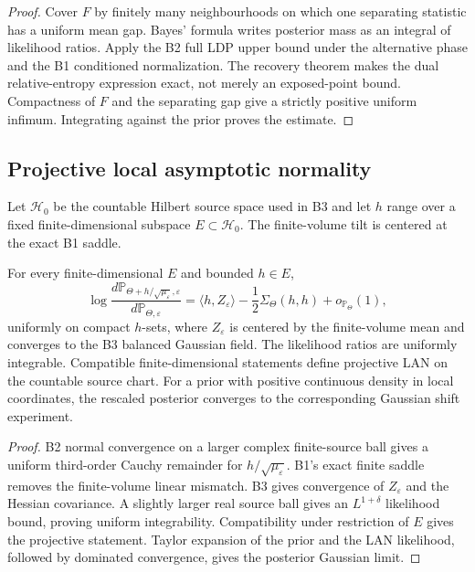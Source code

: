 \begin{proof}
Cover \(F\) by finitely many neighbourhoods on which one separating statistic
has a uniform mean gap.  Bayes' formula writes posterior mass as an integral
of likelihood ratios.  Apply the B2 full LDP upper bound under the alternative
phase and the B1 conditioned normalization.  The recovery theorem makes the
dual relative-entropy expression exact, not merely an exposed-point bound.
Compactness of \(F\) and the separating gap give a strictly positive uniform
infimum.  Integrating against the prior proves the estimate.
\end{proof}

\subsection{Projective local asymptotic normality}

Let \({\mathcal H}_0\) be the countable Hilbert source space used in B3 and
let \(h\) range over a fixed finite-dimensional subspace
\(E\subset{\mathcal H}_0\).  The finite-volume tilt is centered at the exact
B1 saddle.

\begin{theorem}
\label{thm:r5-c1-lan}
For every finite-dimensional \(E\) and bounded \(h\in E\),
\[
 \log\frac{d\mathbb P_{\Theta+h/\sqrt{\mu_\varepsilon},\varepsilon}}
               {d\mathbb P_{\Theta,\varepsilon}}
 =
 \langle h,Z_\varepsilon\rangle
 -\frac12\Sigma_\Theta(h,h)+o_{\mathbb P_\Theta}(1),
\]
uniformly on compact \(h\)-sets, where \(Z_\varepsilon\) is centered by the
finite-volume mean and converges to the B3 balanced Gaussian field.  The
likelihood ratios are uniformly integrable.  Compatible finite-dimensional
statements define projective LAN on the countable source chart.  For a prior
with positive continuous density in local coordinates, the rescaled posterior
converges to the corresponding Gaussian shift experiment.
\end{theorem}

\begin{proof}
B2 normal convergence on a larger complex finite-source ball gives a uniform
third-order Cauchy remainder for
\(h/\sqrt{\mu_\varepsilon}\).  B1's exact finite saddle removes the
finite-volume linear mismatch.  B3 gives convergence of \(Z_\varepsilon\)
and the Hessian covariance.  A slightly larger real source ball gives an
\(L^{1+\delta}\) likelihood bound, proving uniform integrability.
Compatibility under restriction of \(E\) gives the projective statement.
Taylor expansion of the prior and the LAN likelihood, followed by dominated
convergence, gives the posterior Gaussian limit.
\end{proof}

